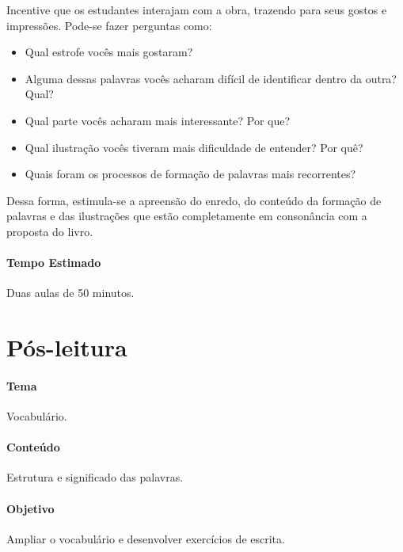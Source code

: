 \documentclass[11pt]{extarticle}
\begin{document}
Incentive que os estudantes interajam com a obra, trazendo para seus gostos e impressões. Pode-se fazer perguntas como:

\begin{itemize}
\item Qual estrofe vocês mais gostaram?
\item Alguma dessas palavras vocês acharam difícil de identificar dentro da outra? Qual?
\item Qual parte vocês acharam mais interessante? Por que?
\item Qual ilustração vocês tiveram mais dificuldade de entender? Por quê?
\item Quais foram os processos de formação de palavras mais recorrentes?
\end{itemize}

Dessa forma, estimula-se a apreensão do enredo, do conteúdo da formação de palavras e das ilustrações que estão completamente em consonância com a proposta do livro.

\paragraph{Tempo Estimado} Duas aulas de 50 minutos. 

\section{Pós-leitura}


\paragraph{Tema} Vocabulário. 

\paragraph{Conteúdo} Estrutura e significado das palavras.

\paragraph{Objetivo} Ampliar o vocabulário e desenvolver exercícios de escrita.
\end{document}

